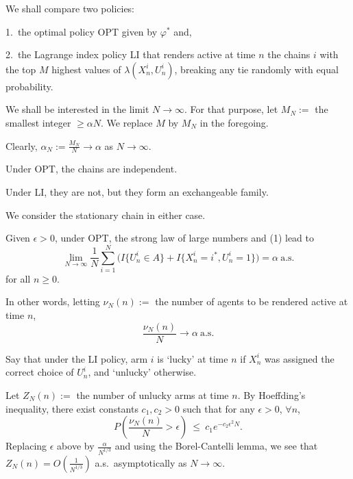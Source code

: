 \documentclass{slides}
\begin{document}
{We shall compare two policies: 

1.\ the optimal policy OPT given by $\varphi^*$ and,

2.\ the Lagrange index policy LI that renders active at time $n$ the chains $i$ with the top $M$ highest values of $\lambda(X^i_n,U^i_n)$, breaking any tie randomly with equal probability.

\newpage 

We shall be interested in the limit $N\to\infty$. For that purpose, let $M_N :=$ the smallest integer  $\geq \alpha N$. We replace $M$ by $M_N$ in the foregoing. 

Clearly, $\alpha_N := \frac{M_N}{N} \to \alpha$ as $N\to\infty$.  

Under OPT, the chains are independent. 

Under LI, they are not, but they form an exchangeable family. 

We consider the stationary chain in either case.

\newpage

Given $\epsilon > 0$, under OPT, the strong law of large numbers and (1) lead to
\begin{equation}
\lim_{N\to\infty}\frac{1}{N}\sum_{i=1}^N\Big(I\{U^i_n \in A\}+I\{X^i_n = i^*,U^i_n=1\}\Big) = \alpha \ \mbox{a.s.} \label{SLLN}
\end{equation}
for all $n \geq 0$.

 In other words, letting $\nu_N(n) :=$ the number of agents to be rendered active at time $n$, 
\begin{equation}
\frac{\nu_N(n)}{N}\to\alpha \ \mbox{a.s.} \label{SLLN2}
\end{equation}

\newpage

Say that under the LI policy, arm $i$ is {\color{red} `lucky'} at time $n$ if $X^i_n$ was assigned the correct choice of $U^i_n$, and {\color{red} `unlucky'} otherwise. 

Let $Z_N(n) :=$ the number of unlucky arms at time $n$. By Hoeffding's inequality, there exist constants $c_1,c_2>0$ such that for any $\epsilon > 0$, $\forall n$,
\begin{equation}
P\left(\frac{\nu_N(n)}{N} > \epsilon\right) \ \leq \ c_1e^{-c_2\epsilon^2N}. \label{Hoeff}
\end{equation}
Replacing $\epsilon$ above by $\frac{\alpha}{N^{1/3}}$ and using the Borel-Cantelli lemma, we see that $Z_N(n) = O\left(\frac{1}{N^{1/3}}\right)$ a.s.\ asymptotically as $N\to\infty$.

}
\end{document}
